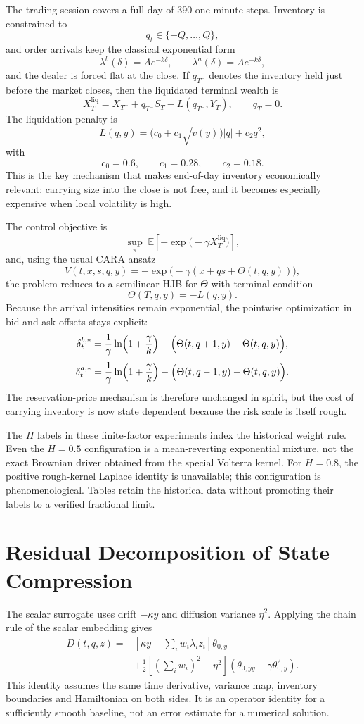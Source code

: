The trading session covers a full day of \(390\) one-minute steps. Inventory is constrained to
\[
q_t\in\{-Q,\dots,Q\},
\]
and order arrivals keep the classical exponential form
\[
\lambda^b(\delta)=Ae^{-k\delta},
\qquad
\lambda^a(\delta)=Ae^{-k\delta},
\]
and the dealer is forced flat at the close. If \(q_{T^-}\) denotes the inventory held just before the market closes, then the liquidated terminal wealth is
\[
X_T^{\mathrm{liq}}
=
X_{T^-}+q_{T^-}S_T-L(q_{T^-},Y_T),
\qquad q_T=0.
\]
The liquidation penalty is
\[
L(q,y)=\bigl(c_0+c_1\sqrt{v(y)}\bigr)|q|+c_2q^2,
\]
with
\[
c_0=0.6,\qquad c_1=0.28,\qquad c_2=0.18.
\]
This is the key mechanism that makes end-of-day inventory economically relevant: carrying size into the close is not free, and it becomes especially expensive when local volatility is high.

The control objective is
\[
\sup_{\pi}\;\mathbb{E}\!\left[-\exp\!\bigl(-\gamma X_T^{\mathrm{liq}}\bigr)\right],
\]
and, using the usual CARA ansatz
\[
V(t,x,s,q,y)=-\exp\!\bigl(-\gamma(x+qs+\Theta(t,q,y))\bigr),
\]
the problem reduces to a semilinear HJB for \(\Theta\) with terminal condition
\[
\Theta(T,q,y)=-L(q,y).
\]
Because the arrival intensities remain exponential, the pointwise optimization in bid and ask offsets stays explicit:
\[
\delta_t^{b,*}
=
\frac{1}{\gamma}\ln\!\left(1+\frac{\gamma}{k}\right)
-\Bigl(\Theta(t,q+1,y)-\Theta(t,q,y)\Bigr),
\]
\[
\delta_t^{a,*}
=
\frac{1}{\gamma}\ln\!\left(1+\frac{\gamma}{k}\right)
-\Bigl(\Theta(t,q-1,y)-\Theta(t,q,y)\Bigr).
\]
The reservation-price mechanism is therefore unchanged in spirit, but the cost of carrying inventory is now state dependent because the risk scale is itself rough.

The $H$ labels in these finite-factor experiments index the historical weight rule. Even the $H=0.5$ configuration is a mean-reverting exponential mixture, not the exact Brownian driver obtained from the special Volterra kernel. For $H=0.8$, the positive rough-kernel Laplace identity is unavailable; this configuration is phenomenological. Tables retain the historical data without promoting their labels to a verified fractional limit.
\section{Residual Decomposition of State Compression}


The scalar surrogate uses drift $-\kappa y$ and diffusion variance $\eta^2$. Applying the chain rule of the scalar embedding gives
\begin{align*}
 D(t,q,z)={}&\left[\kappa y-\sum_iw_i\lambda_i z_i\right]\theta_{0,y}\\
 &+\frac12\left[\left(\sum_iw_i\right)^2-\eta^2\right]
 \left(\theta_{0,yy}-\gamma\theta_{0,y}^2\right).
\end{align*}
This identity assumes the same time derivative, variance map, inventory boundaries and Hamiltonian on both sides. It is an operator identity for a sufficiently smooth baseline, not an error estimate for a numerical solution.


